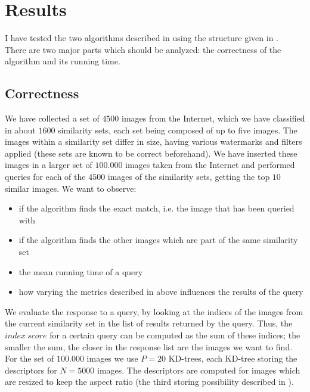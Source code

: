 \chapter{Results}

I have tested the two algorithms described in  using the structure given in .\\
There are two major parts which should be analyzed: the correctness of the algorithm and its running time.

\section{Correctness}

We have collected a set of $4500$ images from the Internet, which we have classified in about $1600$ similarity sets, each set being composed of up to five images. The images within a similarity set differ in size, having various watermarks and filters applied (these sets are known to be correct beforehand). We have inserted these images in a larger set of $100.000$ images taken from the Internet and performed queries for each of the $4500$ images of the similarity sets, getting the top $10$ similar images. We want to observe:
\begin{itemize}
	\item if the algorithm finds the exact match, i.e. the image that has been queried with
	\item if the algorithm finds the other images which are part of the same similarity set
	\item the mean running time of a query
	\item how varying the metrics described in  above influences the results of the query
\end{itemize}

We evaluate the response to a query, by looking at the indices of the images from the current similarity set in the list of results returned by the query. Thus, the $index\ score$ for a certain query can be computed as the sum of these indices; the smaller the sum, the closer in the response list are the images we want to find. \\
For the set of $100.000$ images we use $P=20$ KD-trees, each KD-tree storing the descriptors for $N=5000$ images. The descriptors are computed for images which are resized to keep the aspect ratio (the third storing possibility described in ).\\

